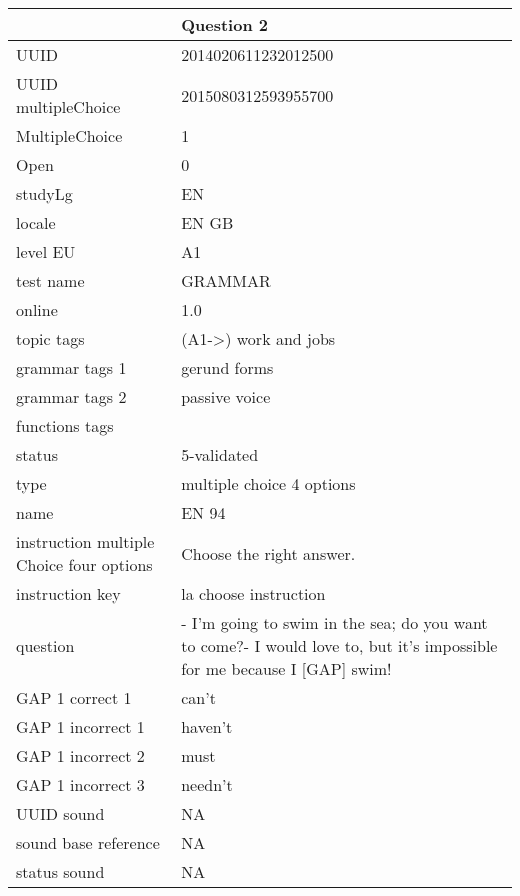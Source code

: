 \begin{table}[ht]
\begin{tabular}{p{5cm}|p{8cm}}
 & Question 2 \\ \hline
UUID & 2014020611232012500 \\
UUID multipleChoice & 2015080312593955700 \\
MultipleChoice & 1 \\
Open & 0 \\
studyLg & EN \\
locale & EN GB \\
level EU & A1 \\
test name & GRAMMAR \\
online & 1.0 \\
topic tags & (A1-\textgreater{}) work and jobs \\
grammar tags 1 & gerund forms \\
grammar tags 2 & passive voice \\
functions tags &  \\
status & 5-validated \\
type & multiple choice 4 options \\
name & EN 94 \\
instruction multiple Choice four options & Choose the right answer. \\
instruction key & la choose instruction \\
question & - I'm going to swim in the sea; do you want to come?- I would love to, but it's impossible for me because I {[}GAP{]} swim! \\
GAP 1 correct 1 & can't \\
GAP 1 incorrect 1 & haven't \\
GAP 1 incorrect 2 & must \\
GAP 1 incorrect 3 & needn't \\
UUID sound & NA \\
sound base reference & NA \\
status sound & NA
\end{tabular}%
\end{table}
